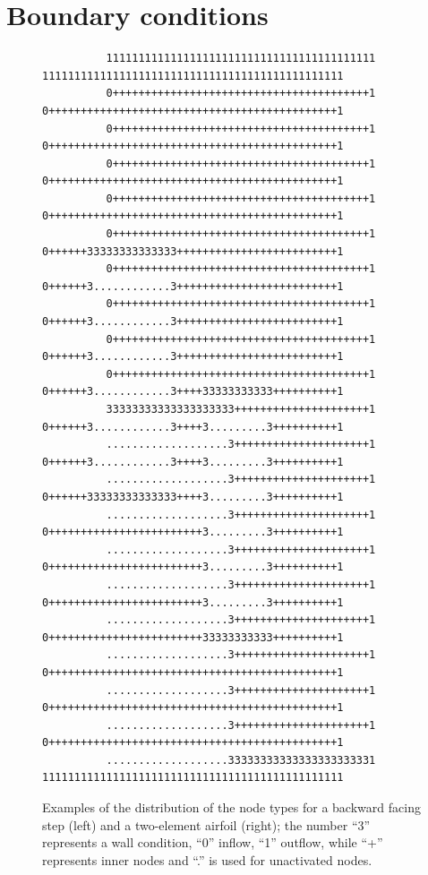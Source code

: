 \section{Boundary conditions}


\begin{figure}
\begin{verbatim}
          111111111111111111111111111111111111111111       11111111111111111111111111111111111111111111111
          0++++++++++++++++++++++++++++++++++++++++1       0+++++++++++++++++++++++++++++++++++++++++++++1
          0++++++++++++++++++++++++++++++++++++++++1       0+++++++++++++++++++++++++++++++++++++++++++++1
          0++++++++++++++++++++++++++++++++++++++++1       0+++++++++++++++++++++++++++++++++++++++++++++1
          0++++++++++++++++++++++++++++++++++++++++1       0+++++++++++++++++++++++++++++++++++++++++++++1
          0++++++++++++++++++++++++++++++++++++++++1       0++++++33333333333333+++++++++++++++++++++++++1
          0++++++++++++++++++++++++++++++++++++++++1       0++++++3............3+++++++++++++++++++++++++1
          0++++++++++++++++++++++++++++++++++++++++1       0++++++3............3+++++++++++++++++++++++++1
          0++++++++++++++++++++++++++++++++++++++++1       0++++++3............3+++++++++++++++++++++++++1
          0++++++++++++++++++++++++++++++++++++++++1       0++++++3............3++++33333333333++++++++++1
          33333333333333333333+++++++++++++++++++++1       0++++++3............3++++3.........3++++++++++1
          ...................3+++++++++++++++++++++1       0++++++3............3++++3.........3++++++++++1
          ...................3+++++++++++++++++++++1       0++++++33333333333333++++3.........3++++++++++1
          ...................3+++++++++++++++++++++1       0++++++++++++++++++++++++3.........3++++++++++1
          ...................3+++++++++++++++++++++1       0++++++++++++++++++++++++3.........3++++++++++1
          ...................3+++++++++++++++++++++1       0++++++++++++++++++++++++3.........3++++++++++1
          ...................3+++++++++++++++++++++1       0++++++++++++++++++++++++33333333333++++++++++1
          ...................3+++++++++++++++++++++1       0+++++++++++++++++++++++++++++++++++++++++++++1
          ...................3+++++++++++++++++++++1       0+++++++++++++++++++++++++++++++++++++++++++++1
          ...................3+++++++++++++++++++++1       0+++++++++++++++++++++++++++++++++++++++++++++1
          ...................33333333333333333333331       11111111111111111111111111111111111111111111111
\end{verbatim}
\caption{Examples of the distribution of the node types for
   a backward facing step (left)
   and a two-element airfoil (right); the number ``3'' represents
   a wall condition, ``0'' inflow, ``1'' outflow,
    while ``+'' represents inner nodes and
   ``.'' is used for unactivated nodes.}
\label{fig:BCtypes}
\end{figure}
%


